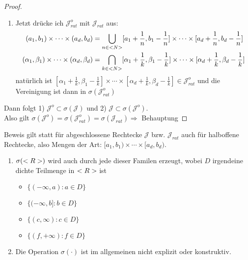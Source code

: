 \begin{proof}
\begin{enumerate}[label=(\arabic*)]
		\item Jetzt drücke ich $\mathscr{J}_{rat}^o$ mit $\mathscr{J}_{rat}$ aus:
		\begin{align}
		(a_1,b_1) \times \cdots \times (a_d,b_d) &= \bigcup_{n\in <N>} [a_1 +\frac{1}{n}, b_1-\frac{1}{n}] \times \cdots \times [a_d +\frac{1}{n}, b_d-\frac{1}{n}] \notag \\
		(\alpha_1,\beta_1) \times \cdots \times (\alpha_d,\beta_d) &= \bigcap_{k\in <N>} [\alpha_1 +\frac{1}{k}, \beta_1-\frac{1}{k}] \times \cdots \times [\alpha_d +\frac{1}{k}, \beta_d-\frac{1}{k}] \notag
		\end{align}
		natürlich ist $[\alpha_1 +\frac{1}{k}, \beta_1-\frac{1}{k}] \times \cdots \times [\alpha_d +\frac{1}{k}, \beta_d-\frac{1}{k}] \in \mathscr{J}_{rat}^o$ und die Vereinigung ist dann in $\sigma(\mathscr{J}_{rat}^o)$
	\end{enumerate}
		Dann folgt 1) $\mathscr{J}^o \subset \sigma(\mathscr{J})$ und 2) $\mathscr{J} \subset \sigma(\mathscr{J}^o)$.\\
		Also gilt $\sigma(\mathscr{J}^o) = \sigma(\mathscr{J}^o_{rat}) = \sigma(\mathscr{J}_{rat}) \Rightarrow$ Behauptung 
\end{proof}

\begin{hint}
	Beweis gilt statt für abgeschlossene Rechtecke $\mathscr{J}$ bzw. $\mathscr{J}_{rat}$ auch für halboffene Rechtecke, also Mengen der Art: $[a_1,b_1) \times \cdots \times [a_d,b_d)$.
\end{hint}

\begin{remark}
	\begin{enumerate}
		\item $\sigma(<R>)$ wird auch durch jede dieser Familen erzeugt, wobei $D$ irgendeine dichte Teilmenge in $<R>$ ist
			\begin{itemize}
				\item $\{(-\infty,a) \colon a \in D\}$
				\item $\{(-\infty,b] \colon b \in D\}$
				\item $\{(c,\infty) \colon c \in D\}$
				\item $\{(f,+\infty) \colon f \in D\}$
			\end{itemize}
		\item Die Operation $\sigma(\cdot)$ ist im allgemeinen nicht explizit oder konstruktiv.
	\end{enumerate}
\end{remark}